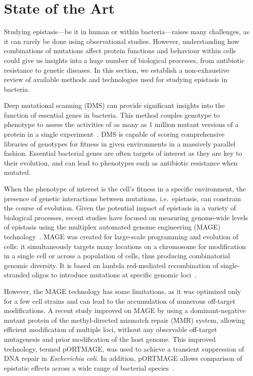 \documentclass[12pt]{article}
\begin{document}
  \section{State of the Art}

  Studying epistasis---be it in human or within bacteria---raises many
  challenges, as it can rarely be done using observational studies. However,
  understanding how combinations of mutations affect protein functions and
  behaviour within cells could give us insights into a huge number of
  biological processes, from antibiotic resistance to genetic diseases. In this
  section, we establish a non-exhaustive review of available methods and
  technologies used for studying epistasis in bacteria.

  Deep mutational scanning (DMS) can provide significant insights into the
  function of essential genes in bacteria. This method couples genotype to
  phenotype to assess the activities of as many as 1 million mutant versions of
  a protein in a single experiment~\cite{fowler2014deep}. DMS is capable of
  scoring comprehensive libraries of genotypes for fitness in given
  environments in a massively parallel fashion. Essential bacterial genes are
  often targets of interest as they are key to their evolution, and can lead to
  phenotypes such as antibiotic resistance when mutated. 

  When the phenotype of interest is the cell's fitness in a specific
  environment, the presence of genetic interactions between mutations, i.e.\
  epistasis, can constrain the course of evolution. Given the potential impact
  of epistasis in a variety of biological processes, recent studies have
  focused on measuring genome-wide levels of epistasis using the multiplex
  automated genome engineering (MAGE) technology~\cite{wang2012}. MAGE was
  created for large-scale programming and evolution of cells: it simultaneously
  targets many locations on a chromosome for modification in a single cell or
  across a population of cells, thus producing combinatorial genomic diversity.
  It is based on lambda red-mediated recombination of single-stranded oligos to
  introduce mutations at specific genomic loci~\cite{wang2009programming}.

  However, the MAGE technology has some limitations, as it was optimized only
  for a few cell strains and can lead to the accumulation of numerous
  off-target modifications. A recent study improved on MAGE by using a
  dominant-negative mutant protein of the methyl-directed mismatch repair (MMR)
  system, allowing efficient modification of multiple loci, without
  any observable off-target mutagenesis and prior modification of the host
  genome. This improved technology, termed pORTMAGE, was used to achieve a
  transient suppression of DNA repair in \textit{Escherichia coli}. In
  addition, pORTMAGE allows comparison of epistatic effects across a wide range
  of bacterial species~\cite{nyerges2016highly}.
\end{document}
